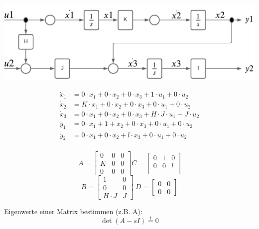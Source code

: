 \documentclass[10pt,a4paper]{article}
\begin{document}
\begin{center}
	\includegraphics[width=0.96\columnwidth]{Figures/Signalflussplan.png}
\end{center}

\begin{mdframed}[style=exercise]
	\begin{align*}
		\dot{x}_{1} & = 0\cdot x_{1} +0\cdot x_{2} +0\cdot x_{3} +1\cdot u_{1}+0\cdot u_{2}        \\
		\dot{x}_{2} & = K\cdot x_{1} +0\cdot x_{2} +0\cdot x_{3} +0\cdot u_{1}+0\cdot u_{2}        \\
		\dot{x}_{3} & = 0\cdot x_{1} +0\cdot x_{2} +0\cdot x_{3} +H\cdot J\cdot u_{1}+J\cdot u_{2} \\
		\dot{y}_{1} & = 0\cdot x_{1} +1+x_{2} +0\cdot x_{3} +0\cdot u_{1}+0\cdot u_{2}             \\
		\dot{y}_{2} & = 0\cdot x_{1} +0\cdot x_{2} +l\cdot x_{3} +0\cdot u_{1}+0\cdot u_{2}        \\
	\end{align*}
\end{mdframed}

\begin{mdframed}[style=exercise]
	\[
		\ A = \begin{bmatrix}
			0 & 0 & 0 \\
			K & 0 & 0 \\
			0 & 0 & 0
		\end{bmatrix}
		C = \begin{bmatrix}
			0 & 1 & 0 \\
			0 & 0 & l \\
		\end{bmatrix}\]
	\[B = \begin{bmatrix}
			1         & 0 \\
			0         & 0 \\
			H\cdot{}J & J
		\end{bmatrix} \
		D = \begin{bmatrix}
			0 & 0 \\
			0 & 0
		\end{bmatrix}
	\]

	Eigenwerte einer Matrix bestimmen (z.B. A):
    \[
        \operatorname{det}(A - sI) \overset{!}{=} 0
    \]
\end{mdframed}
\end{document}
